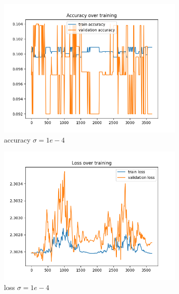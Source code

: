 \documentclass[a4paper]{article}
\begin{document}
\begin{figure}[h]
	\begin{subfigure}{0.3\textwidth}
		\centering
		\includegraphics[width=\linewidth]{images/sens_sigma_0.0001_use_bn_False_acc.png}
		\caption{accuracy $\sigma=1e-4$}
	\end{subfigure}
	\begin{subfigure}{0.3\textwidth}
		\centering
		\includegraphics[width=\linewidth]{images/sens_sigma_0.0001_use_bn_False_loss.png}
		\caption{loss $\sigma=1e-4$}
	\end{subfigure}
	\begin{subfigure}{0.3\textwidth}
		\centering

\end{subfigure}
\end{figure}
\end{document}
